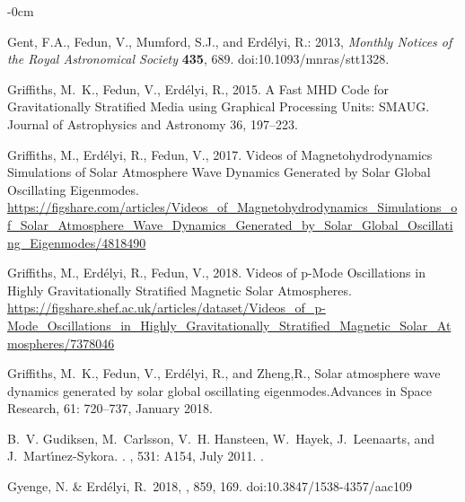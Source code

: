 \documentclass[physics,article,submit,pdftex,moreauthors]{Definitions/mdpi}
\begin{document}
\begin{adjustwidth}{-\extralength}{0cm}
\begin{thebibliography}{999}
Gent, F.A., Fedun, V., Mumford, S.J., and Erd{\'e}lyi, R.: 2013, {\it Monthly Notices of the Royal Astronomical Society} {\bf 435}, 689. doi:10.1093/mnras/stt1328.


{Griffiths}, M.~K., {Fedun}, V., {Erd{\'e}lyi}, R., 2015. {A Fast MHD Code for
  Gravitationally Stratified Media using Graphical Processing Units: SMAUG}.
  Journal of Astrophysics and Astronomy 36, 197--223.

{Griffiths}, M., {Erd{\'e}lyi}, R., {Fedun}, V., 2017. {Videos of
  Magnetohydrodynamics Simulations of Solar Atmosphere Wave Dynamics Generated
  by Solar Global Oscillating Eigenmodes}.
\newline \url{https://figshare.com/articles/Videos_of_Magnetohydrodynamics_Simulations_of_Solar_Atmosphere_Wave_Dynamics_Generated_by_Solar_Global_Oscillating_Eigenmodes/4818490}

{Griffiths}, M., {Erd{\'e}lyi}, R., {Fedun}, V., 2018. {Videos of p-Mode Oscillations in Highly Gravitationally Stratified Magnetic Solar Atmospheres}.
\newline \url{https://figshare.shef.ac.uk/articles/dataset/Videos_of_p-Mode_Oscillations_in_Highly_Gravitationally_Stratified_Magnetic_Solar_Atmospheres/7378046}




{Griffiths}, M.~K., {Fedun}, V., {Erd{\'e}lyi}, R., and {Zheng},R.,
{Solar atmosphere wave dynamics generated by solar global oscillating
  eigenmodes}.{Advances in Space Research}, 61: 720--737, January 2018.

B.~V. {Gudiksen}, M.~{Carlsson}, V.~H. {Hansteen}, W.~{Hayek}, J.~{Leenaarts},
  and J.~{Mart{\'{\i}}nez-Sykora}.
.
\newblock \emph{\aap}, 531: A154, July 2011.
\newblock {}.


 Gyenge, N. \& Erd{\'e}lyi, R.\ 2018, \apj, 859, 169. doi:10.3847/1538-4357/aac109


\end{thebibliography}
\end{adjustwidth}
\end{document}
